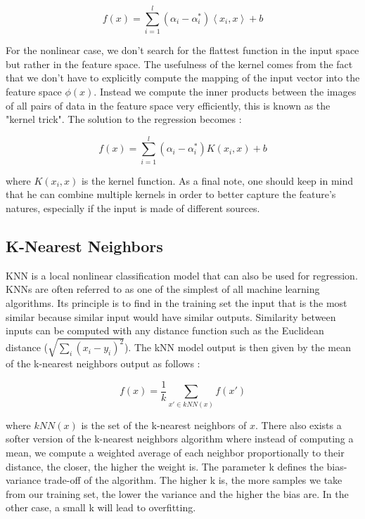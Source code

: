 \documentclass[11pt,a4paper,oneside]{book}
\begin{document}
\begin{equation}
f\left ( x \right ) = \sum_{i=1}^l \left ( \alpha_i - \alpha_i^* \right )\left \langle x_i, x \right \rangle + b
\end{equation}



For the nonlinear case, we don't search for the flattest function in the input space but rather in the feature space. The usefulness of the kernel comes from the fact that we don't have to explicitly compute the mapping of the input vector into the feature space $\phi(x)$. Instead we compute the inner products between the images of all pairs of data in the feature space very efficiently, this is known as the "kernel trick". The solution to the regression becomes :


\begin{equation}
f\left ( x \right ) = \sum_{i=1}^l \left ( \alpha_i - \alpha_i^* \right )K\left ( x_i, x \right ) + b
\end{equation}

where $K\left ( x_i, x \right )$ is the kernel function. As a final note, one should keep in mind that he can combine multiple kernels in order to better capture the feature's natures, especially if the input is made of different sources.


\subsection{K-Nearest Neighbors}

KNN is a local nonlinear classification model that can also be used for regression. KNNs are often referred to as one of the simplest of all machine learning algorithms. Its principle is to find in the training set the input that is the most similar because similar input would have similar outputs. Similarity between inputs can be computed with any distance function such as the Euclidean distance ($\sqrt{\sum_i \left (  x_i - y_i \right )^{2}}$). The kNN model output is then given by the mean of the k-nearest neighbors output as follows :


\begin{equation}
f\left ( x \right ) = \frac{1}{k}\sum_{x' \in kNN(x) } f\left ( x' \right )
\end{equation}

where $kNN(x)$ is the set of the k-nearest neighbors of $x$. There also exists a softer version of the k-nearest neighbors algorithm where instead of computing a mean, we compute a weighted average of each neighbor proportionally to their distance, the closer, the higher the weight is. The parameter k defines the bias-variance trade-off of the algorithm. The higher k is, the more samples we take from our training set, the lower the variance and the higher the bias are. In the other case, a small k will lead to overfitting. \cite{navot}
\end{document}
